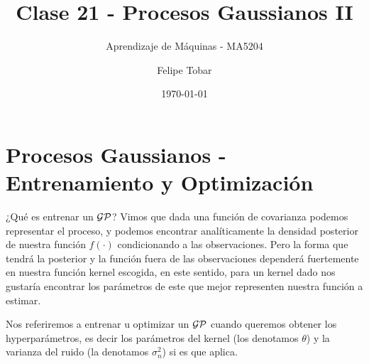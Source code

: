 \documentclass[9pt]{beamer}
\title{Clase 21 - Procesos Gaussianos II}
\subtitle{Aprendizaje de Máquinas - MA5204}
\date{\today}
\author{Felipe Tobar}
\institute{Department of Mathematical Engineering \&\\ Center for Mathematical Modelling\\Universidad de Chile}
\begin{document}
\begin{frame}
  \titlepage
\end{frame}

\section{Procesos Gaussianos - Entrenamiento y Optimización} 

\begin{frame}{¿Qué es entrenar un $\mathcal{GP}$?}
    Vimos que dada una función de covarianza podemos representar el proceso, y podemos encontrar analíticamente la densidad posterior de nuestra función $f(\cdot)$ condicionando a las observaciones. Pero la forma que tendrá la posterior y la función fuera de las observaciones dependerá fuertemente en nuestra función kernel escogida, en este sentido, para un kernel dado nos gustaría encontrar los parámetros de este que mejor representen nuestra función a estimar.
    \vspace{0.2cm} \pause 

    Nos referiremos a entrenar u optimizar un $\mathcal{GP}$ cuando queremos obtener los hyperparámetros, es decir los parámetros del kernel (los denotamos $\theta$) y la varianza del ruido (la denotamos $\sigma_n^2$) si es que aplica.

    
\end{frame}
\end{document}
